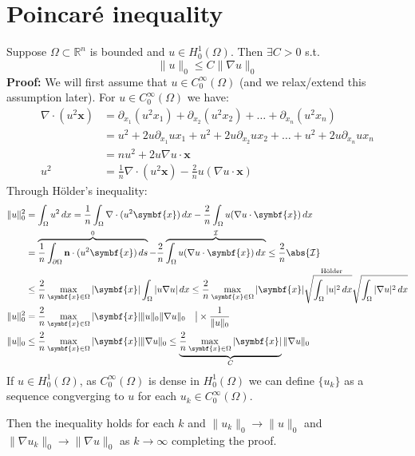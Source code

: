 \section*{Poincaré inequality}
Suppose $\Omega \subset \mathbb{R}^n$ is bounded and $u \in H_0^1(\Omega)$. Then $\exists C > 0$ s.t.
\[
    \|u\|_0 \leq C \|\nabla u\|_0
\]
\textbf{Proof:}
We will first assume that $u \in C_0^\infty(\Omega)$ (and we relax/extend this assumption later).
For $u \in C_0^\infty(\Omega)$ we have:
\begin{align*}
    \nabla \cdot (u^2 \symbf{x}) & = \partial_{x_1}(u^2 x_1) + \partial_{x_2}(u^2 x_2) + \ldots + \partial_{x_n}(u^2 x_n)                   \\
                                 & = u^2 + 2u \partial_{x_1} u x_1 + u^2 + 2u \partial_{x_2} u x_2 + \ldots + u^2 + 2u \partial_{x_n} u x_n \\
                                 & = n u^2 + 2u \nabla u \cdot \symbf{x}                                                                    \\
    u^2                          & = \frac{1}{n} \nabla \cdot (u^2 \symbf{x}) - \frac{2}{n} u (\nabla u \cdot \symbf{x})
\end{align*}
Through Hölder's inequality:
\begin{align*}
    \|u\|_0^2 & = \int_\Omega u^2 \, dx = \frac{1}{n} \int_\Omega \nabla \cdot (u^2 \symbf{x}) \, dx - \frac{2}{n} \int_\Omega u (\nabla u \cdot \symbf{x}) \, dx                                                                                             \\
              & = \overbrace{\frac{1}{n} \int_{\partial \Omega} \mathbf{n} \cdot (u^2 \symbf{x}) \, ds}^{0} - \frac{2}{n} \overbrace{\int_\Omega u (\nabla u \cdot \symbf{x}) \, dx}^{\mathcal{I}} \leq \frac{2}{n} \abs{\mathcal{I}}                         \\
              & \leq \frac{2}{n} \max_{\symbf{x} \in \Omega} |\symbf{x}| \int_\Omega |u \nabla u| \, dx \leq\frac{2}{n} \max_{\symbf{x} \in \Omega} \overset{\text{Hölder}}{|\symbf{x}| \sqrt{\int_\Omega |u|^2 \, dx} \sqrt{\int_\Omega |\nabla u|^2 \, dx}} \\
    \|u\|_0^2 & = \frac{2}{n} \max_{\symbf{x} \in \Omega} |\symbf{x}| \|u\|_0 \|\nabla u\|_0 \quad \big| \times \frac{1}{\|u\|_0}                                                                                                                             \\
    \|u\|_0   & \leq \frac{2}{n} \max_{\symbf{x} \in \Omega} |\symbf{x}| \|\nabla u\|_0 \leq \underbrace{\frac{2}{n} \max_{\symbf{x} \in \Omega}{|\symbf{x}|}}_{C} \|\nabla u\|_0
\end{align*}
If $u \in H_0^1(\Omega)$, as $C_0^\infty(\Omega)$ is dense in $H_0^1(\Omega)$ we can define $\{u_k\}$ as a sequence congverging to $u$ for each $u_k \in C_0^\infty(\Omega)$.

Then the inequality holds for each $k$ and $\|u_k\|_0 \to \|u\|_0$ and $\|\nabla u_k\|_0 \to \|\nabla u\|_0$ as $k \to \infty$ completing the proof.

